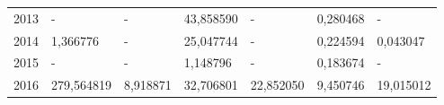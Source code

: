 \begin{table}
\begin{tabular}{p{1cm}p{2cm}p{2cm}p{2cm}p{2cm}p{2cm}p{2cm}}
 2013 &                                           - &                          - &                   43,858590 &                                          - &               0,280468 &                      - \\
 2014 &                                    1,366776 &                          - &                   25,047744 &                                          - &               0,224594 &               0,043047 \\
 2015 &                                           - &                          - &                    1,148796 &                                          - &               0,183674 &                      - \\
 2016 &                                  279,564819 &                   8,918871 &                   32,706801 &                                  22,852050 &               9,450746 &              19,015012 \\
\bottomrule
\end{tabular}
\end{table}
